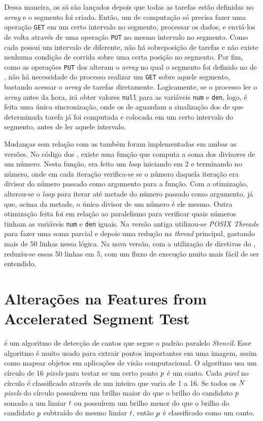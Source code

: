 Dessa maneira, os \CCs só são lançados depois que todas as tarefas estão definidas no \textit{array} e o segmento foi criado. Então, um \cluster de computação só precisa fazer uma operação \texttt{GET} em um certo intervalo no segmento, processar os dados, e enviá-los de volta através de uma operação \texttt{PUT} no mesmo intervalo no segmento. Como cada \CC possui um intervalo de \offsets diferente, não há sobreposição de tarefas e não existe nenhuma condição de corrida sobre uma certa posição no segmento. Por fim, como as operações \texttt{PUT} dos \CCs alteram o \textit{array} no qual o segmento foi definido no \cluster de \IO, não há necessidade do processo \master realizar um \texttt{GET} sobre aquele segmento, bastando acessar o \textit{array} de tarefas diretamente. Logicamente, se o processo \master ler o \textit{array} antes da hora, irá obter valores \texttt{null} para as variáveis \texttt{num} e \texttt{den}, logo, é feita uma única sincronização, onde os \clusters de \IO aguardam a sinalização dos \CCs de que determinada tarefa já foi computada e colocada em um certo intervalo do segmento, antes de ler aquele intervalo.

Mudanças sem relação com as \APIs também foram implementadas em ambas as versões. No código dos \slaves, existe uma função que computa a soma dos divisores de um número. Nesta função, era feito um \textit{loop} iniciando em 2 e terminando no número, onde em cada iteração verifica-se se o número daquela iteração era divisor do número passado como argumento para a função. Com a otimização, alterou-se o \textit{loop} para iterar até metade do número passado como argumento, já que, acima da metade, o único divisor de um número é ele mesmo. Outra otimização feita foi em relação ao paralelismo para verificar quais números tinham as variáveis \texttt{num} e \texttt{den} iguais. Na versão antiga utilizou-se \textit{POSIX Threads} para fazer uma soma parcial e depois uma redução na \textit{thread} principal, gastando mais de 50 linhas nessa lógica. Na nova versão, com a utilização de diretivas do \OpenMP, reduziu-se essas 50 linhas em 5, com um fluxo de execução muito mais fácil de ser entendido.

\section{Alterações na Features from Accelerated Segment Test}
\label{sec:alteracoesfast}

\textit{\FAST} é um algoritmo de detecção de cantos que segue o padrão paralelo \textit{Stencil}. Esse algoritmo é muito usado para extrair pontos importantes em uma imagem, assim como mapear objetos em aplicações de visão computacional. O algoritmo usa um círculo de 16 \textit{pixels} para testar se um certo ponto $\mathnormal{p}$ é um canto. Cada \textit{pixel} no círculo é classificado através de um inteiro que varia de 1 a 16. Se todos os $\mathnormal{N}$ \textit{pixels} do círculo possuírem um brilho maior do que o brilho do candidato $\mathnormal{p}$ somado a um limiar $\mathnormal{t}$ ou possuírem um brilho menor do que o brilho do candidato $\mathnormal{p}$ subtraído do mesmo limiar $\mathnormal{t}$, então $\mathnormal{p}$ é classificado como um canto.


